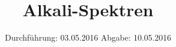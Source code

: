 
\subject{605}
\title{Alkali-Spektren}
\date{
  Durchführung: 03.05.2016
  \hspace{3em}
  Abgabe: 10.05.2016
}



\maketitle
\newpage
\mbox{}
\newpage
\thispagestyle{empty}
\tableofcontents
\newpage






\nocite{numpy}
\nocite{matplotlib}
\nocite{uncertainties}
\printbibliography


